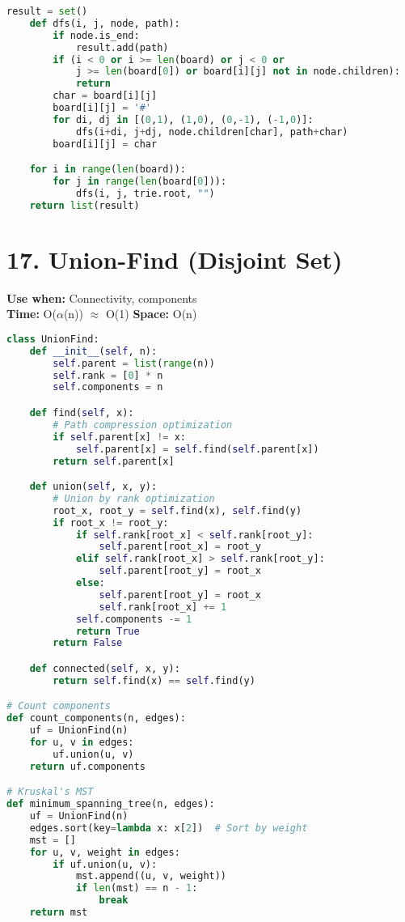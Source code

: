 \documentclass[8pt,landscape]{article}
\begin{document}
\begin{multicols}{3}
\begin{lstlisting}[language=Python]
    result = set()
    def dfs(i, j, node, path):
        if node.is_end:
            result.add(path)
        if (i < 0 or i >= len(board) or j < 0 or
            j >= len(board[0]) or board[i][j] not in node.children):
            return
        char = board[i][j]
        board[i][j] = '#'
        for di, dj in [(0,1), (1,0), (0,-1), (-1,0)]:
            dfs(i+di, j+dj, node.children[char], path+char)
        board[i][j] = char

    for i in range(len(board)):
        for j in range(len(board[0])):
            dfs(i, j, trie.root, "")
    return list(result)
\end{lstlisting}

\section*{17. Union-Find (Disjoint Set)}
\textbf{Use when:} Connectivity, components \\
\textbf{Time:} O($\alpha$(n)) $\approx$ O(1) \quad \textbf{Space:} O(n)
\begin{lstlisting}[language=Python]
class UnionFind:
    def __init__(self, n):
        self.parent = list(range(n))
        self.rank = [0] * n
        self.components = n

    def find(self, x):
        # Path compression optimization
        if self.parent[x] != x:
            self.parent[x] = self.find(self.parent[x])
        return self.parent[x]

    def union(self, x, y):
        # Union by rank optimization
        root_x, root_y = self.find(x), self.find(y)
        if root_x != root_y:
            if self.rank[root_x] < self.rank[root_y]:
                self.parent[root_x] = root_y
            elif self.rank[root_x] > self.rank[root_y]:
                self.parent[root_y] = root_x
            else:
                self.parent[root_y] = root_x
                self.rank[root_x] += 1
            self.components -= 1
            return True
        return False

    def connected(self, x, y):
        return self.find(x) == self.find(y)

# Count components
def count_components(n, edges):
    uf = UnionFind(n)
    for u, v in edges:
        uf.union(u, v)
    return uf.components

# Kruskal's MST
def minimum_spanning_tree(n, edges):
    uf = UnionFind(n)
    edges.sort(key=lambda x: x[2])  # Sort by weight
    mst = []
    for u, v, weight in edges:
        if uf.union(u, v):
            mst.append((u, v, weight))
            if len(mst) == n - 1:
                break
    return mst
\end{lstlisting}


\end{multicols}
\end{document}
